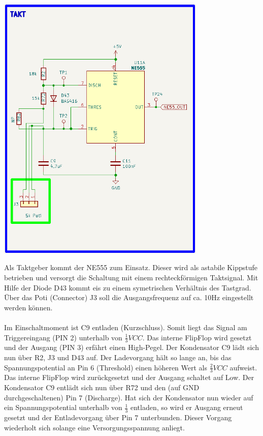 \begin{center}
\includegraphics[width=10cm]{Bilder/Takt.png}
\end{center}

Als Taktgeber kommt der \glqq NE555 \grqq{} zum Einsatz. Dieser wird als astabile Kippstufe betrieben und versorgt die Schaltung mit einem rechteckförmigen Taktsignal. Mit Hilfe der Diode D43 kommt eis zu einem symetrischen Verhältnis des Tastgrad. Über das Poti (Connector) J3 soll die Ausgangsfrequenz auf ca. 10Hz eingestellt werden können. 
\\
\\
Im Einschaltmoment ist C9 entladen (Kurzschluss). Somit liegt das Signal am Triggereingang (PIN 2) unterhalb von $\frac{1}{3} VCC$. Das interne FlipFlop wird gesetzt und der Ausgang (PIN 3) erfährt einen High-Pegel. Der Kondensator C9 lädt sich nun über R2, J3 und D43 auf. Der Ladevorgang hält so lange an, bis das Spannungspotential an Pin 6 (Threshold) einen höheren Wert als $\frac{2}{3} VCC$ aufweist. Das interne FlipFlop wird zurückgesetzt und der Ausgang schaltet auf Low. Der Kondensator C9 entlädt sich nun über R72 und den (auf GND durchgeschaltenen) Pin 7 (Discharge). Hat sich der Kondensator nun wieder auf ein Spannungspotential unterhalb von $\frac{1}{3}$ entladen, so wird er Ausgang erneut gesetzt und der Entladevorgang über Pin 7 unterbunden. Dieser Vorgang wiederholt sich solange eine Versorgungsspannung anliegt. 

